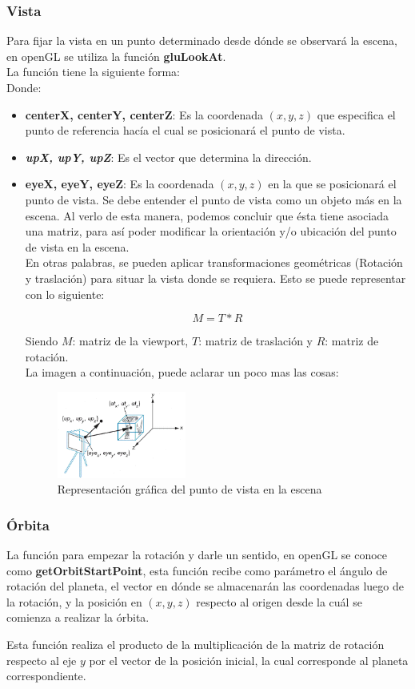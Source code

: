 \documentclass[12pt,journal,compsoc]{IEEEtran}
\begin{document}
\subsubsection{Vista}
Para fijar la vista en un punto determinado desde dónde se observará la escena, en openGL se utiliza la función \textbf{gluLookAt}. \\La función tiene la siguiente forma:\\
%

%
\bigskip
\bigskip
Donde:
%
\begin{itemize}
	\item \textbf{centerX, centerY, centerZ}: Es la coordenada $(x,y,z)$ que especifica el punto de referencia hacía el cual se posicionará el punto de vista.
	\item \textbf{\textit{upX, upY, upZ}}: Es el vector que determina la dirección.
	\item \textbf{eyeX, eyeY, eyeZ}: Es la coordenada $(x,y,z)$ en la que se posicionará el punto de vista.
%
Se debe entender el punto de vista como un objeto más en la escena. Al verlo de esta manera, podemos concluir que ésta tiene asociada una matriz, para así poder modificar la orientación y/o ubicación del punto de vista en la escena.\\
En otras palabras, se pueden aplicar transformaciones geométricas (Rotación y traslación)  para situar la  vista donde se requiera. Esto se puede representar con lo siguiente:

\[
	M = T * R
\]

Siendo $M$: matriz de la viewport, $T$: matriz de traslación y $R$: matriz de rotación.\\La imagen a continuación, puede aclarar un poco mas las cosas:

\begin{figure}[h!]
	\includegraphics[width=0.4\textwidth, height=0.25\textwidth]{viewport.png}
	\centering
	\caption{Representación gráfica del punto de vista en la escena}
\end{figure}
%
\end{itemize}
\subsubsection{Órbita}
La función para empezar la rotación y darle un sentido, en openGL se conoce como \textbf{getOrbitStartPoint}, esta función recibe como parámetro el ángulo de rotación del planeta, el vector en dónde se almacenarán las coordenadas luego de la rotación, y la posición en $(x,y,z)$ respecto al origen desde la cuál se comienza a realizar la órbita.
%

%
Esta función realiza el producto de la multiplicación de la matriz de rotación respecto al eje $y$ por el vector de la posición inicial, la cual corresponde al planeta correspondiente.
\end{document}
